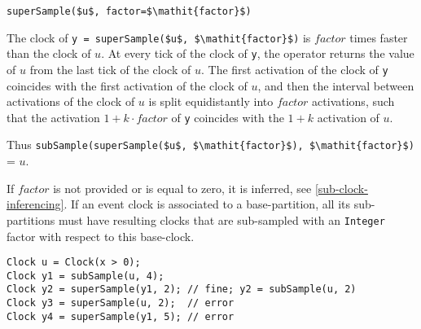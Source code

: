 \begin{operatordefinition}[superSample]
\begin{synopsis}\begin{lstlisting}
superSample($u$, factor=$\mathit{factor}$)
\end{lstlisting}\end{synopsis}
\begin{semantics}
The clock of \lstinline!y = superSample($u$, $\mathit{factor}$)! is $\mathit{factor}$ times faster than the clock of $u$.
At every tick of the clock of \lstinline!y!, the operator returns the value of $u$ from the last tick of the clock of $u$.
The first activation of the clock of \lstinline!y! coincides with the first activation of the clock of $u$, and then the interval between activations of the clock of $u$ is split equidistantly into $\mathit{factor}$ activations, such that the activation $1 + k \cdot \mathit{factor}$ of \lstinline!y! coincides with the $1 + k$ activation of $u$.
\begin{nonnormative}
Thus \lstinline!subSample(superSample($u$, $\mathit{factor}$), $\mathit{factor}$)! = $u$.
\end{nonnormative}
If $\mathit{factor}$ is not provided or is equal to zero, it is inferred, see \cref{sub-clock-inferencing}.
If an event clock is associated to a base-partition, all its sub-partitions must have resulting clocks that are sub-sampled with an \lstinline!Integer! factor with respect to this base-clock.

\begin{example}
\begin{lstlisting}[language=modelica]
Clock u = Clock(x > 0);
Clock y1 = subSample(u, 4);
Clock y2 = superSample(y1, 2); // fine; y2 = subSample(u, 2)
Clock y3 = superSample(u, 2);  // error
Clock y4 = superSample(y1, 5); // error
\end{lstlisting}
\end{example}
\end{semantics}
\end{operatordefinition}

